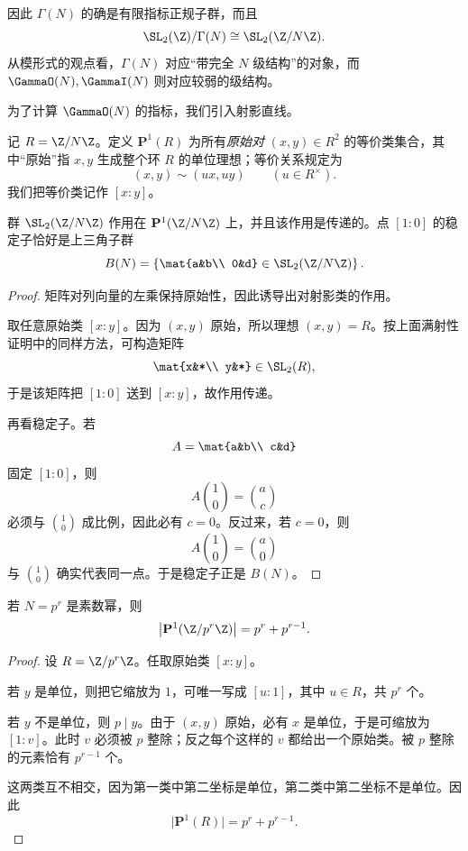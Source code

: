 \begin{remark}
因此 $\Gamma(N)$ 的确是有限指标正规子群，而且
\[
\SL_2(\Z)/\Gamma(N)\cong \SL_2(\Z/N\Z).
\]
从模形式的观点看，$\Gamma(N)$ 对应“带完全 $N$ 级结构”的对象，而 $\GammaO(N),\GammaI(N)$ 则对应较弱的级结构。
\end{remark}

为了计算 $\GammaO(N)$ 的指标，我们引入射影直线。

\begin{definition}
记 $R=\Z/N\Z$。定义 $\mathbf{P}^1(R)$ 为所有\emph{原始对} $(x,y)\in R^2$ 的等价类集合，其中“原始”指 $x,y$ 生成整个环 $R$ 的单位理想；等价关系规定为
\[
(x,y)\sim (ux,uy)\qquad (u\in R^\times).
\]
我们把等价类记作 $[x:y]$。
\end{definition}

\begin{proposition}
群 $\SL_2(\Z/N\Z)$ 作用在 $\mathbf{P}^1(\Z/N\Z)$ 上，并且该作用是传递的。点 $[1:0]$ 的稳定子恰好是上三角子群
\[
B(N)=\left\{\mat{a&b\\ 0&d}\in \SL_2(\Z/N\Z)\right\}.
\]
\end{proposition}

\begin{proof}
矩阵对列向量的左乘保持原始性，因此诱导出对射影类的作用。

取任意原始类 $[x:y]$。因为 $(x,y)$ 原始，所以理想 $(x,y)=R$。按上面满射性证明中的同样方法，可构造矩阵
\[
\mat{x&*\\ y&*}\in \SL_2(R),
\]
于是该矩阵把 $[1:0]$ 送到 $[x:y]$，故作用传递。

再看稳定子。若
\[
A=\mat{a&b\\ c&d}
\]
固定 $[1:0]$，则
\[
A\binom{1}{0}=\binom{a}{c}
\]
必须与 $\binom{1}{0}$ 成比例，因此必有 $c=0$。反过来，若 $c=0$，则
\[
A\binom{1}{0}=\binom{a}{0}
\]
与 $\binom{1}{0}$ 确实代表同一点。于是稳定子正是 $B(N)$。
\end{proof}

\begin{lemma}
若 $N=p^r$ 是素数幂，则
\[
\bigl|\mathbf{P}^1(\Z/p^r\Z)\bigr|=p^r+p^{r-1}.
\]
\end{lemma}

\begin{proof}
设 $R=\Z/p^r\Z$。任取原始类 $[x:y]$。

若 $y$ 是单位，则把它缩放为 $1$，可唯一写成 $[u:1]$，其中 $u\in R$，共 $p^r$ 个。

若 $y$ 不是单位，则 $p\mid y$。由于 $(x,y)$ 原始，必有 $x$ 是单位，于是可缩放为 $[1:v]$。此时 $v$ 必须被 $p$ 整除；反之每个这样的 $v$ 都给出一个原始类。被 $p$ 整除的元素恰有 $p^{r-1}$ 个。

这两类互不相交，因为第一类中第二坐标是单位，第二类中第二坐标不是单位。因此
\[
\bigl|\mathbf{P}^1(R)\bigr|=p^r+p^{r-1}.
\]
\end{proof}

